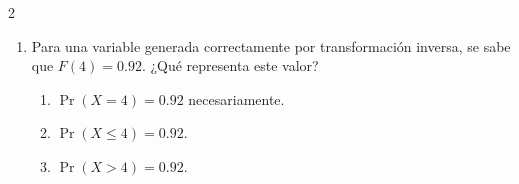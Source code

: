 \documentclass[11pt]{article}
\begin{document}
\begin{multicols}{2}
\begin{enumerate}
    \item Para una variable generada correctamente por transformación inversa,
    se sabe que $F(4)=0.92$. ¿Qué representa este valor?
    \begin{enumerate}
        \item $\Pr(X=4)=0.92$ necesariamente.
        \item $\Pr(X\leq4)=0.92$.
        \item $\Pr(X>4)=0.92$.
    \end{enumerate}
\end{enumerate}
\end{multicols}
\endgroup
\end{document}
